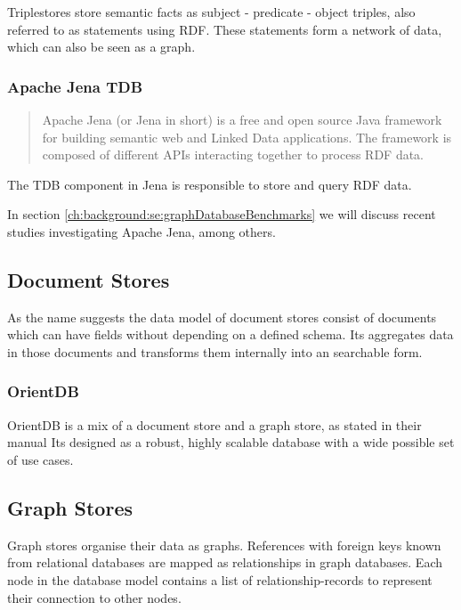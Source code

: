 Triplestores store semantic facts as subject - predicate - object triples,
also referred to as statements using RDF.
These statements form a network of data,
which can also be seen as a graph. \cite[4]{Ontotext2014}

\subsubsection{Apache Jena TDB}
\blockquote[\cite{Apache2015}]{Apache Jena (or Jena in short) is a free and open source Java framework for building semantic web and Linked Data applications.
The framework is composed of different APIs interacting together to process RDF data.}

The TDB component in Jena is responsible to store and query RDF data. \cite{Apache}

In section \ref{ch:background:se:graphDatabaseBenchmarks} we will discuss recent studies investigating Apache Jena, among others.

\subsection{Document Stores}
As the name suggests the data model of document stores consist of documents which can have fields without depending on a defined schema\cite{OrientDB}.
Its aggregates data in those documents and transforms them internally into an searchable form\cite{Techopedia2017}.

\subsubsection{OrientDB}
OrientDB is a mix of a document store and a graph store,
as stated in their manual 
Its designed as a robust, highly scalable database with a wide possible set of use cases. \cite{OrientDB}

\subsection{Graph Stores}
\label{ch:background:se:graphStores}
Graph stores organise their data as graphs.
References with foreign keys known from relational databases are mapped as relationships in graph databases.
Each node in the database model contains a list of relationship-records to represent their connection to other nodes. \cite{NeoTechnologyInc.2016}

